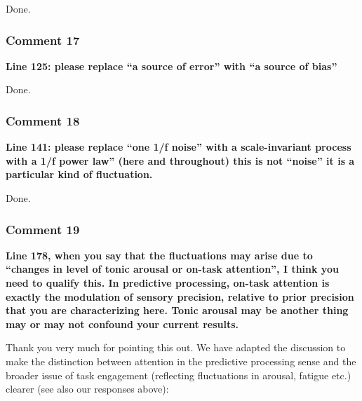\documentclass[
]{article}
\begin{document}
Done.

\hypertarget{comment-17}{%
\subsubsection{Comment 17}\label{comment-17}}

\textbf{Line 125: please replace ``a source of error'' with ``a source
of bias''}

Done.

\hypertarget{comment-18}{%
\subsubsection{Comment 18}\label{comment-18}}

\textbf{Line 141: please replace ``one 1/f noise'' with a
scale-invariant process with a 1/f power law'' (here and throughout)
this is not ``noise'' it is a particular kind of fluctuation.}

Done.

\hypertarget{comment-19}{%
\subsubsection{Comment 19}\label{comment-19}}

\textbf{Line 178, when you say that the fluctuations may arise due to
``changes in level of tonic arousal or on-task attention'', I think you
need to qualify this. In predictive processing, on-task attention is
exactly the modulation of sensory precision, relative to prior precision
that you are characterizing here. Tonic arousal may be another thing may
or may not confound your current results.}

Thank you very much for pointing this out. We have adapted the
discussion to make the distinction between attention in the predictive
processing sense and the broader issue of task engagement (reflecting
fluctuations in arousal, fatigue etc.) clearer (see also our responses
above):
\end{document}
